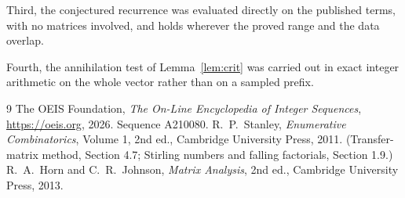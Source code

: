 \documentclass[11pt,a4paper]{article}
\theoremstyle{plain}
\theoremstyle{definition}
\begin{document}
Third, the conjectured recurrence was evaluated directly on the published terms, with no
matrices involved, and holds wherever the proved range and the data overlap.

Fourth, the annihilation test of Lemma~\ref{lem:crit} was carried out in exact integer
arithmetic on the whole vector rather than on a sampled prefix.

\begin{thebibliography}{9}
 The OEIS Foundation, \emph{The On-Line Encyclopedia of Integer
Sequences}, \url{https://oeis.org}, 2026. Sequence A210080.
 R.~P.~Stanley, \emph{Enumerative Combinatorics}, Volume 1, 2nd ed.,
Cambridge University Press, 2011. (Transfer-matrix method, Section 4.7; Stirling numbers and
falling factorials, Section 1.9.)
 R.~A.~Horn and C.~R.~Johnson, \emph{Matrix Analysis}, 2nd ed., Cambridge
University Press, 2013.
\end{thebibliography}
\end{document}
